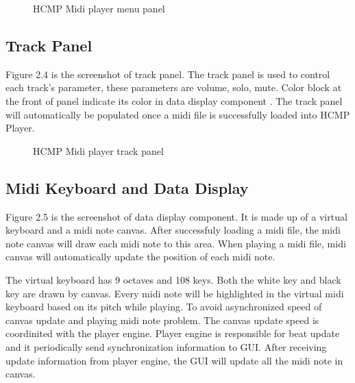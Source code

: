 \begin{figure}[H]
\caption{HCMP Midi player menu panel}
\label{fig:speciation}
\end{figure}

\subsection{Track Panel}

Figure 2.4 is the screenshot of track panel. The track panel is used to 
control each track's parameter, these parameters are volume, solo, mute. Color
block at the front of panel indicate its color in data display component . The 
track panel will automatically be populated once a midi file is successfully 
loaded into HCMP Player. 
\begin{figure}[H]
\caption{HCMP Midi player track panel}
\label{fig:speciation}
\end{figure}

\subsection{Midi Keyboard and Data Display}
Figure 2.5 is the screenshot of data display component. It is made up of a virtual  
keyboard and a midi note canvas. After successfuly loading a midi file, the midi 
note canvas will 
draw each midi note to this area. When playing a midi file, midi canvas will 
automatically update the position of each midi note. 

The virtual keyboard has 9 octaves and 108 keys. Both the white key and black key 
are drawn by canvas. Every midi note will be highlighted in the 
virtual midi keyboard based on its pitch while playing. To avoid asynchronized speed 
of canvas update and playing midi note problem. The canvas update speed is 
coordinited with the player engine. Player engine is responsible for beat update and it 
periodically send synchronization information to GUI. After receiving update 
information from player engine, the GUI will update all the midi note in canvas.


